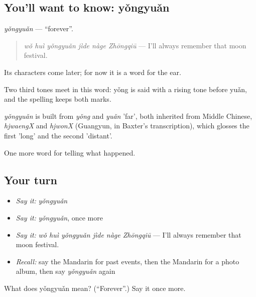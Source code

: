 \subsection*{You'll want to know: yǒngyuǎn}
\emph{yǒngyuǎn} — \textquotedblleft{}forever\textquotedblright{}.

\begin{quote}
\emph{wǒ huì yǒngyuǎn jìde nàge Zhōngqiū} — I'll always remember that moon festival.
\end{quote}

Its characters come later; for now it is a word for the ear.

Two third tones meet in this word: yǒng is said with a rising tone before yuǎn, and the spelling keeps both marks.

\begin{cousinweb}
\emph{yǒngyuǎn} is built from \emph{yǒng} and \emph{yuǎn} 'far', both inherited from Middle Chinese, \emph{hjwaengX} and \emph{hjwonX} (Guangyun, in Baxter's transcription), which glosses the first 'long' and the second 'distant'.
\end{cousinweb}

\begin{grammarlens}[title={What you've built}]
One more word for telling what happened.
\end{grammarlens}

\subsection*{Your turn}
\begin{itemize}
\raggedright
  \item \emph{Say it:} \emph{yǒngyuǎn}
  \item \emph{Say it:} \emph{yǒngyuǎn}, once more
  \item \emph{Say it:} \emph{wǒ huì yǒngyuǎn jìde nàge Zhōngqiū} — I'll always remember that moon festival.
  \item \emph{Recall:} say the Mandarin for past events, then the Mandarin for a photo album, then say \emph{yǒngyuǎn} again
\end{itemize}

\begin{tcolorbox}[breakable,colback=teal!4,colframe=teal!35!black,title={Before you move on}]
What does yǒngyuǎn mean? (\textquotedblleft{}Forever\textquotedblright{}.) Say it once more.
\end{tcolorbox}
